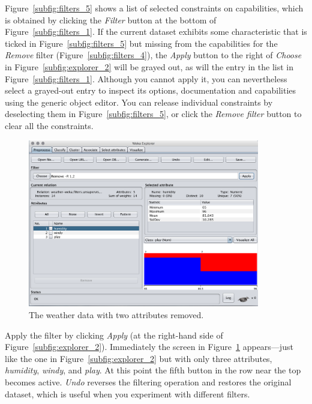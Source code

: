 Figure~\ref{subfig:filters_5} shows a list of selected constraints on
capabilities, which is obtained by clicking the \textit{Filter} button
at the bottom of Figure~\ref{subfig:filters_1}. If the current dataset
exhibits some characteristic that is ticked in
Figure~\ref{subfig:filters_5} but missing from the capabilities for
the \textit{Remove} filter (Figure~\ref{subfig:filters_4}), the
\textit{Apply} button to the right of \textit{Choose} in
Figure~\ref{subfig:explorer_2} will be grayed out, as will the entry
in the list in Figure~\ref{subfig:filters_1}. Although you cannot
apply it, you can nevertheless select a grayed-out entry to inspect
its options, documentation and capabilities using the generic object
editor. You can release individual constraints by deselecting them in
Figure~\ref{subfig:filters_5}, or click the \textit{Remove filter}
button to clear all the constraints.

\begin{figure}[!ht]
\centering
\includegraphics[width=0.9\textwidth]{images/B2_10.png}
\caption{The weather data with two attributes removed.}
\label{fig:weather_minus_two}
\end{figure}


Apply the filter by clicking \textit{Apply} (at the right-hand side of
Figure~\ref{subfig:explorer_2}). Immediately the screen in
Figure~\ref{fig:weather_minus_two} appears---just like the one in
Figure~\ref{subfig:explorer_2} but with only three attributes,
\textit{humidity}, \textit{windy}, and \textit{play}. At this point
the fifth button in the row near the top becomes active. \textit{Undo}
reverses the filtering operation and restores the original dataset,
which is useful when you experiment with different filters.


